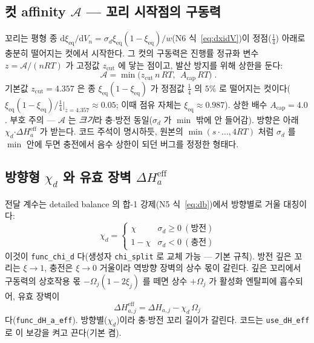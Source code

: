 \documentclass[11pt,a4paper]{article}
\newcommand{\dd}{\mathrm{d}}
\newcommand{\eff}{\mathrm{eff}}
\newcommand{\eq}{\mathrm{eq}}
\newcommand{\code}[1]{\texttt{#1}}
\begin{document}
\subsection{컷 affinity $\mathcal A$ — 꼬리 시작점의 구동력}
꼬리는 평형 종 $\dd\xi_\eq/\dd V_n=\sigma_d\xi_\eq(1-\xi_\eq)/w$(N6 식~\eqref{eq:dxidV})이 정점($\tfrac14$) 아래로 충분히 떨어지는 컷에서 시작한다. 그 컷의 구동력은 진행률 정규화 변수 $z=\mathcal A/(nRT)$ 가 고정값 $z_\mathrm{cut}$ 에 닿는 점이고, 발산 방지를 위해 상한을 둔다:
\begin{equation}
\boxed{\;\mathcal A=\min\!\big(z_\mathrm{cut}\,n\,RT,\ \ A_\mathrm{cap}\,RT\big)\;.}
\label{eq:Acut}
\end{equation}
기본값 $z_\mathrm{cut}=4.357$ 은 종 $\xi_\eq(1-\xi_\eq)$ 가 정점값 $\tfrac14$ 의 $5\%$ 로 떨어지는 컷이다($\xi_\eq(1-\xi_\eq)/\tfrac14\big|_{z=4.357}\approx0.05$; 이때 점유 자체는 $\xi_\eq\approx0.987$). 상한 배수 $A_\mathrm{cap}=4.0$. 부호 주의 — $\mathcal A$ 는 \emph{크기}라 충$\cdot$방전 동일($\sigma_d$ 가 $\min$ 밖에 안 들어감). 방향은 아래 $\chi_d$$\cdot\Delta H_a^\eff$ 가 받는다. 코드 주석이 명시하듯, 원본의 $\min(s\cdot\dots,4RT)$ 처럼 $\sigma_d$ 를 $\min$ 안에 두면 충전에서 음수 상한이 되던 버그를 정정한 형태다.

\subsection{방향형 $\chi_d$ 와 유효 장벽 $\Delta H_a^\eff$}
전달 계수는 detailed balance 의 합-1 강제(N5 식~\eqref{eq:db})에서 방향별로 거울 대칭이다:
\begin{equation}
\boxed{\;\chi_d=\begin{cases}\chi & \sigma_d\ge0\ (\text{방전})\\ 1-\chi & \sigma_d<0\ (\text{충전})\end{cases}}
\label{eq:chid}
\end{equation}
이것이 \code{func\_chi\_d} 다(생성자 \code{chi\_split} 로 교체 가능 — 기본 규칙). 방전 깊은 꼬리는 $\xi\to1$, 충전은 $\xi\to0$ 거울이라 역방향 장벽의 상수 몫이 갈린다. 깊은 꼬리에서 구동력의 상호작용 몫 $-\Omega_j(1-2\xi_j)$ 를 떼면 상수 $+\Omega_j$ 가 활성화 엔탈피에 흡수되어, 유효 장벽이
\begin{equation}
\boxed{\;\Delta H_{a,j}^\eff=\Delta H_{a,j}-\chi_d\,\Omega_j\;}
\label{eq:dHeff}
\end{equation}
다(\code{func\_dH\_a\_eff}). 방향별($\chi_d$)이라 충$\cdot$방전 꼬리 길이가 갈린다. 코드는 \code{use\_dH\_eff} 로 이 보강을 켜고 끈다(기본 켬).
\end{document}
